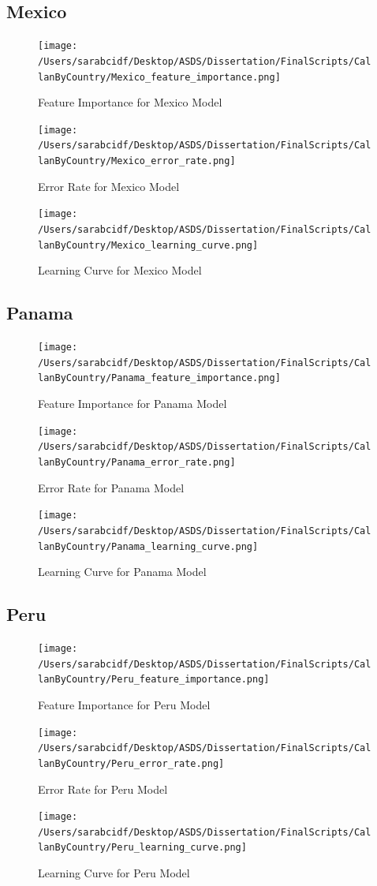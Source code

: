 \documentclass[12pt,letterpaper]{article}
\begin{document}
	\subsection{Mexico}
	\begin{figure}[H]
		\centering
		\caption{Feature Importance for Mexico Model}
		\texttt{[image: /Users/sarabcidf/Desktop/ASDS/Dissertation/FinalScripts/CallanByCountry/Mexico\_feature\_importance.png]}
	\end{figure}
	\begin{figure}[H]
		\centering
		\caption{Error Rate for Mexico Model}
		\texttt{[image: /Users/sarabcidf/Desktop/ASDS/Dissertation/FinalScripts/CallanByCountry/Mexico\_error\_rate.png]}
	\end{figure}
	\begin{figure}[H]
		\centering
		\caption{Learning Curve for Mexico Model}
		\texttt{[image: /Users/sarabcidf/Desktop/ASDS/Dissertation/FinalScripts/CallanByCountry/Mexico\_learning\_curve.png]}
	\end{figure}

	\newpage
	
	\subsection{Panama}
	\begin{figure}[H]
		\centering
		\caption{Feature Importance for Panama Model}
		\texttt{[image: /Users/sarabcidf/Desktop/ASDS/Dissertation/FinalScripts/CallanByCountry/Panama\_feature\_importance.png]}
	\end{figure}
	\begin{figure}[H]
		\centering
		\caption{Error Rate for Panama Model}
		\texttt{[image: /Users/sarabcidf/Desktop/ASDS/Dissertation/FinalScripts/CallanByCountry/Panama\_error\_rate.png]}
	\end{figure}
	\begin{figure}[H]
		\centering
		\caption{Learning Curve for Panama Model}
		\texttt{[image: /Users/sarabcidf/Desktop/ASDS/Dissertation/FinalScripts/CallanByCountry/Panama\_learning\_curve.png]}
	\end{figure}
	
	\newpage
	
	\subsection{Peru}
	\begin{figure}[H]
		\centering
		\caption{Feature Importance for Peru Model}
		\texttt{[image: /Users/sarabcidf/Desktop/ASDS/Dissertation/FinalScripts/CallanByCountry/Peru\_feature\_importance.png]}
	\end{figure}
	\begin{figure}[H]
		\centering
		\caption{Error Rate for Peru Model}
		\texttt{[image: /Users/sarabcidf/Desktop/ASDS/Dissertation/FinalScripts/CallanByCountry/Peru\_error\_rate.png]}
	\end{figure}
	\begin{figure}[H]
		\centering
		\caption{Learning Curve for Peru Model}
		\texttt{[image: /Users/sarabcidf/Desktop/ASDS/Dissertation/FinalScripts/CallanByCountry/Peru\_learning\_curve.png]}
	\end{figure}
	
\end{document}
